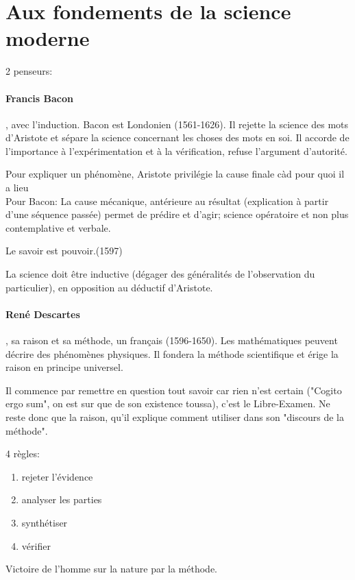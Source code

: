 \documentclass{report}
\begin{document}
	\section{Aux fondements de la science moderne}
	
	2 penseurs:
	
	\paragraph{Francis Bacon}, avec l'induction. Bacon est Londonien (1561-1626). Il rejette la science des mots d'Aristote et sépare la science concernant les choses des mots en soi. Il accorde de l'importance à l'expérimentation et à la vérification, refuse l'argument d'autorité.
	
	Pour expliquer un phénomène, Aristote privilégie la cause finale càd pour quoi il a lieu\\
	Pour Bacon: La cause mécanique, antérieure au résultat (explication à partir d’une séquence passée) permet de prédire et d’agir; science opératoire et non plus contemplative et verbale.
	
	\og Le savoir est pouvoir.\fg (1597)
	
	La science doit être inductive (dégager des généralités de l'observation du particulier), en opposition au déductif d'Aristote.
	
	\paragraph{René Descartes}, sa raison et sa méthode, un français (1596-1650). Les mathématiques peuvent décrire des phénomènes physiques. Il fondera la méthode scientifique et érige la raison en principe universel.
	
	Il commence par remettre en question tout savoir car rien n'est certain ("Cogito ergo sum", on est sur que de son existence toussa), c'est le Libre-Examen. Ne reste donc que la raison, qu'il explique comment utiliser dans son "discours de la méthode".
	
	4 règles:
	\begin{enumerate}
		\item rejeter l'évidence
		\item analyser les parties
		\item synthétiser
		\item vérifier
	\end{enumerate}
	
	Victoire de l'homme sur la nature par la méthode.
	
\end{document}
